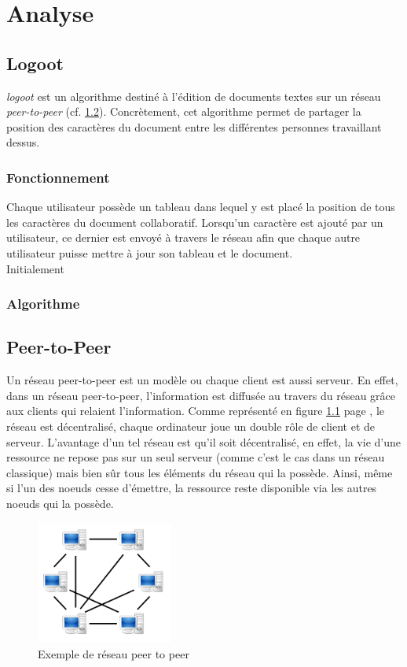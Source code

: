 \chapter{Analyse}

\section{Logoot}
	\emph{logoot} est un algorithme destiné à l'édition de documents textes sur
	un réseau \emph{peer-to-peer} (cf. \ref{sec:p2p}). Concrètement, cet
	algorithme permet de partager la position des caractères du document entre
	les différentes personnes travaillant dessus.
	
	\subsection{Fonctionnement}
		Chaque utilisateur possède un tableau dans lequel y est placé la
		position de tous les caractères du document collaboratif. Lorsqu'un
		caractère est ajouté par un utilisateur, ce dernier est envoyé à travers
		le réseau afin que chaque autre utilisateur puisse mettre à jour son
		tableau et le document.\\
		
		Initialement
			
	\subsection{Algorithme}
		

\section{Peer-to-Peer}\label{sec:p2p}

	Un réseau peer-to-peer est un modèle ou chaque client est aussi serveur. En
	effet, dans un réseau peer-to-peer, l'information est diffusée au travers du
	réseau grâce aux clients qui relaient l'information. Comme représenté en
	figure \ref{fig:p2p} page \pageref{fig:p2p}, le réseau est décentralisé,
	chaque ordinateur joue un double rôle de client et de serveur. L'avantage
	d'un tel réseau est qu'il soit décentralisé, en effet, la vie d'une
	ressource ne repose pas sur un seul serveur (comme c'est le cas dans un
	réseau classique) mais bien sûr tous les éléments du réseau qui la possède.
	Ainsi, même si l'un des noeuds cesse d'émettre, la ressource reste
	disponible via les autres noeuds qui la possède.
	
	\begin{figure}
	  \center
      \includegraphics[width=0.4\textwidth]{includes/P2P-network.png}
      \caption{Exemple de réseau peer to peer}
      \label{fig:p2p}
    \end{figure}
	
